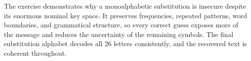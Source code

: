 \documentclass[12pt,a4paper]{article}
\begin{document}
The exercise demonstrates why a monoalphabetic substitution is insecure despite its enormous nominal key space. It preserves frequencies, repeated patterns, word boundaries, and grammatical structure, so every correct guess exposes more of the message and reduces the uncertainty of the remaining symbols. The final substitution alphabet decodes all 26 letters consistently, and the recovered text is coherent throughout.
\end{document}
